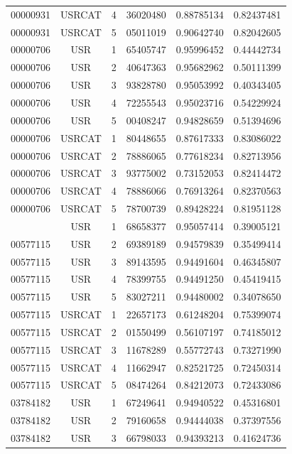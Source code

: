\begin{longtable}{cccccc}
00000931 & USRCAT & 4 & 36020480 & 0.88785134 & 0.82437481\\
00000931 & USRCAT & 5 & 05011019 & 0.90642740 & 0.82042605\\
\hline
00000706 & USR    & 1 & 65405747 & 0.95996452 & 0.44442734\\%
00000706 & USR    & 2 & 40647363 & 0.95682962 & 0.50111399\\
00000706 & USR    & 3 & 93828780 & 0.95053992 & 0.40343405\\
00000706 & USR    & 4 & 72255543 & 0.95023716 & 0.54229924\\
00000706 & USR    & 5 & 00408247 & 0.94828659 & 0.51394696\\
00000706 & USRCAT & 1 & 80448655 & 0.87617333 & 0.83086022\\%
00000706 & USRCAT & 2 & 78886065 & 0.77618234 & 0.82713956\\
00000706 & USRCAT & 3 & 93775002 & 0.73152053 & 0.82414472\\
00000706 & USRCAT & 4 & 78886066 & 0.76913264 & 0.82370563\\
00000706 & USRCAT & 5 & 78700739 & 0.89428224 & 0.81951128\\
\hline
\pagebreak
00577115 & USR    & 1 & 68658377 & 0.95057414 & 0.39005121\\%
00577115 & USR    & 2 & 69389189 & 0.94579839 & 0.35499414\\
00577115 & USR    & 3 & 89143595 & 0.94491604 & 0.46345807\\
00577115 & USR    & 4 & 78399755 & 0.94491250 & 0.45419415\\
00577115 & USR    & 5 & 83027211 & 0.94480002 & 0.34078650\\
00577115 & USRCAT & 1 & 22657173 & 0.61248204 & 0.75399074\\%
00577115 & USRCAT & 2 & 01550499 & 0.56107197 & 0.74185012\\
00577115 & USRCAT & 3 & 11678289 & 0.55772743 & 0.73271990\\
00577115 & USRCAT & 4 & 11662947 & 0.82521725 & 0.72450314\\
00577115 & USRCAT & 5 & 08474264 & 0.84212073 & 0.72433086\\
\hline
03784182 & USR    & 1 & 67249641 & 0.94940522 & 0.45316801\\%
03784182 & USR    & 2 & 79160658 & 0.94444038 & 0.37397556\\
03784182 & USR    & 3 & 66798033 & 0.94393213 & 0.41624736\\

\end{longtable}
